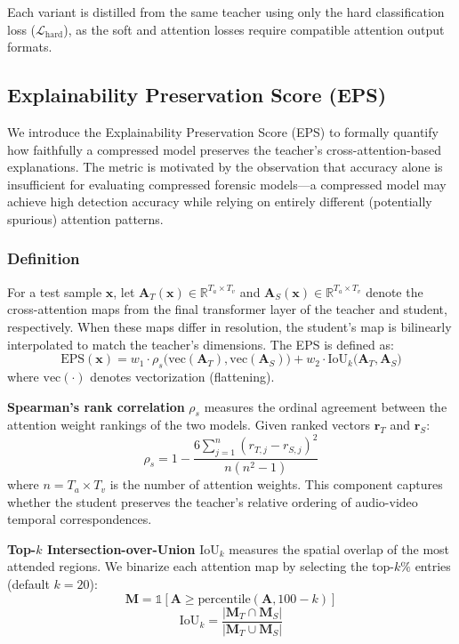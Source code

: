 \documentclass[lettersize,journal]{IEEEtran}
\begin{document}
Each variant is distilled from the same teacher using only the hard classification loss ($\mathcal{L}_{\text{hard}}$), as the soft and attention losses require compatible attention output formats.


\subsection{Explainability Preservation Score (EPS)}
\label{sec:eps}

We introduce the Explainability Preservation Score (EPS) to formally quantify how faithfully a compressed model preserves the teacher's cross-attention-based explanations. The metric is motivated by the observation that accuracy alone is insufficient for evaluating compressed forensic models---a compressed model may achieve high detection accuracy while relying on entirely different (potentially spurious) attention patterns.

\subsubsection{Definition}
For a test sample $\mathbf{x}$, let $\mathbf{A}_T(\mathbf{x}) \in \mathbb{R}^{T_a \times T_v}$ and $\mathbf{A}_S(\mathbf{x}) \in \mathbb{R}^{T_a \times T_v}$ denote the cross-attention maps from the final transformer layer of the teacher and student, respectively. When these maps differ in resolution, the student's map is bilinearly interpolated to match the teacher's dimensions. The EPS is defined as:
\begin{equation}
\label{eq:eps}
    \text{EPS}(\mathbf{x}) = w_1 \cdot \rho_s\bigl(\text{vec}(\mathbf{A}_T), \text{vec}(\mathbf{A}_S)\bigr) + w_2 \cdot \text{IoU}_k\bigl(\mathbf{A}_T, \mathbf{A}_S\bigr)
\end{equation}
where $\text{vec}(\cdot)$ denotes vectorization (flattening).

\textbf{Spearman's rank correlation} $\rho_s$ measures the ordinal agreement between the attention weight rankings of the two models. Given ranked vectors $\mathbf{r}_T$ and $\mathbf{r}_S$:
\begin{equation}
    \rho_s = 1 - \frac{6 \sum_{j=1}^{n} (r_{T,j} - r_{S,j})^2}{n(n^2 - 1)}
\end{equation}
where $n = T_a \times T_v$ is the number of attention weights. This component captures whether the student preserves the teacher's relative ordering of audio-video temporal correspondences.

\textbf{Top-$k$ Intersection-over-Union} $\text{IoU}_k$ measures the spatial overlap of the most attended regions. We binarize each attention map by selecting the top-$k\%$ entries (default $k = 20$):
\begin{equation}
    \mathbf{M} = \mathbb{1}[\mathbf{A} \geq \text{percentile}(\mathbf{A}, 100{-}k)]
\end{equation}
\begin{equation}
    \text{IoU}_k = \frac{|\mathbf{M}_T \cap \mathbf{M}_S|}{|\mathbf{M}_T \cup \mathbf{M}_S|}
\end{equation}
\end{document}
